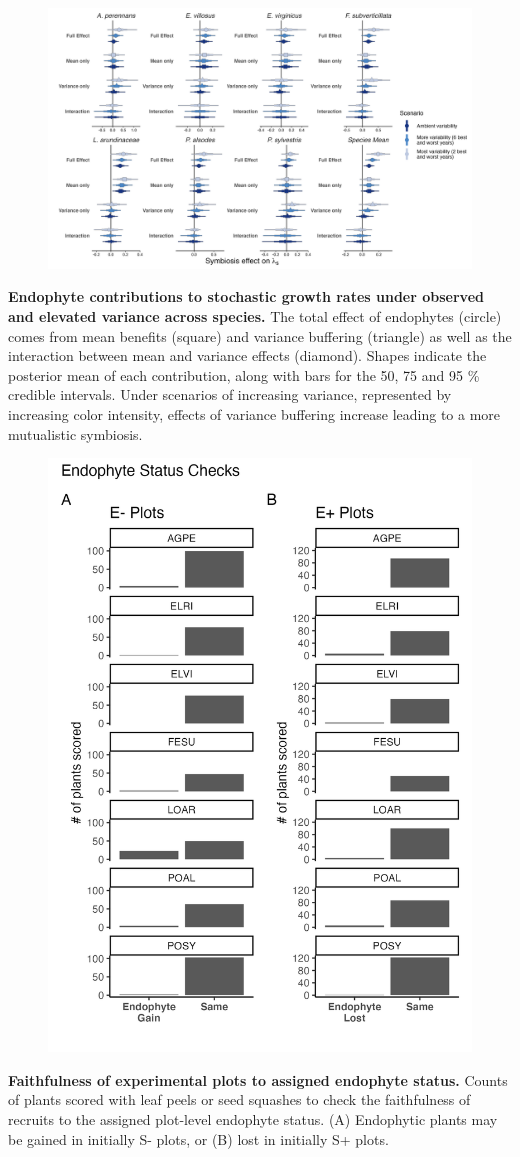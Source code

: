 \documentclass[12pt]{article}
\begin{document}
\begin{figure}
	\centering
	\includegraphics[width=\linewidth]{contributions_obs_plot.png}
\end{figure}
 \textbf{Endophyte contributions to stochastic growth rates under observed and elevated variance across species.} The total effect of endophytes (circle) comes from mean benefits (square) and variance buffering (triangle) as well as the interaction between mean and variance effects (diamond). Shapes indicate the posterior mean of each contribution, along with bars for the 50, 75 and 95 \% credible intervals.  Under scenarios of increasing variance, represented by increasing color intensity, effects of variance buffering increase leading to a more mutualistic symbiosis.
\newpage


\begin{figure}
	\centering
	\includegraphics[width=.6\linewidth]{endo_check_plot.png}
\end{figure}
 \textbf{Faithfulness of experimental plots to assigned endophyte status.} Counts of plants scored with leaf peels or seed squashes to check the faithfulness of recruits to the assigned plot-level endophyte status. (A) Endophytic plants may be gained in initially S- plots, or (B) lost in initially S+ plots.
\newpage
\end{document}
